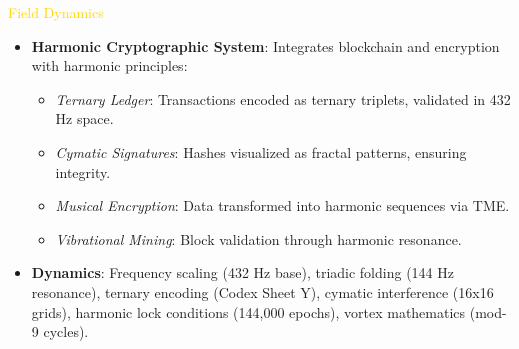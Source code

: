 \textcolor{gold}{ Field Dynamics } \\
\begin{itemize}
    \item \textbf{Harmonic Cryptographic System}: Integrates blockchain and encryption with harmonic principles:
    \begin{itemize}\setlength{\itemsep}{0.2cm}
        \item \textit{Ternary Ledger}: Transactions encoded as ternary triplets, validated in 432 Hz space.
        \item \textit{Cymatic Signatures}: Hashes visualized as fractal patterns, ensuring integrity.
        \item \textit{Musical Encryption}: Data transformed into harmonic sequences via TME.
        \item \textit{Vibrational Mining}: Block validation through harmonic resonance.
    \end{itemize}
    \item \textbf{Dynamics}: Frequency scaling (432 Hz base), triadic folding (144 Hz resonance), ternary encoding (Codex Sheet Y), cymatic interference (16x16 grids), harmonic lock conditions (144,000 epochs), vortex mathematics (mod-9 cycles).
\end{itemize}

